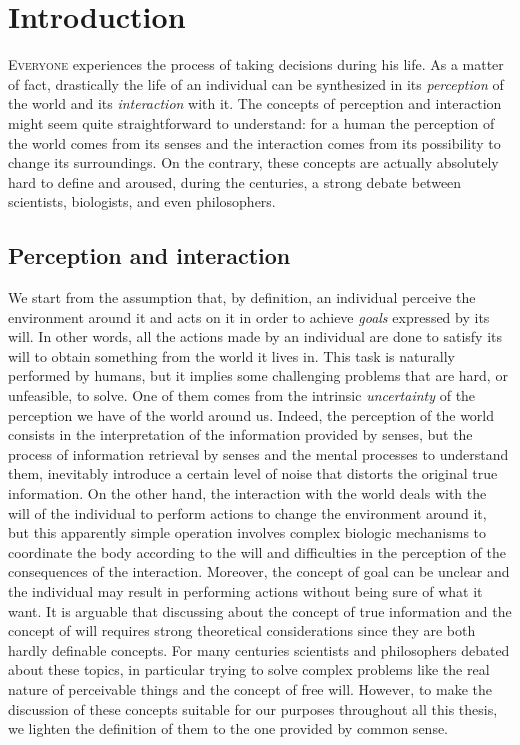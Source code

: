 \chapter{Introduction}
\lettrine{E}{veryone} experiences the process of taking decisions during his life. As a matter of fact, drastically the life of an individual can be synthesized in its \textit{perception} of the world and its \textit{interaction} with it. The concepts of perception and interaction might seem quite straightforward to understand: for a human the perception of the world comes from its senses and the interaction comes from its possibility to change its surroundings. On the contrary, these concepts are actually absolutely hard to define and aroused, during the centuries, a strong debate between scientists, biologists, and even philosophers.

\section{Perception and interaction}
We start from the assumption that, by definition, an individual perceive the environment around it and acts on it in order to achieve \textit{goals} expressed by its will. In other words, all the actions made by an individual are done to satisfy its will to obtain something from the world it lives in. This task is naturally performed by humans, but it implies some challenging problems that are hard, or unfeasible, to solve. One of them comes from the intrinsic \textit{uncertainty} of the perception we have of the world around us. Indeed, the perception of the world consists in the interpretation of the information provided by senses, but the process of information retrieval by senses and the mental processes to understand them, inevitably introduce a certain level of noise that distorts the original true information. On the other hand, the interaction with the world deals with the will of the individual to perform actions to change the environment around it, but this apparently simple operation involves complex biologic mechanisms to coordinate the body according to the will and difficulties in the perception of the consequences of the interaction. Moreover, the concept of goal can be unclear and the individual may result in performing actions without being sure of what it want.
It is arguable that discussing about the concept of true information and the concept of will requires strong theoretical considerations since they are both hardly definable concepts. For many centuries scientists and philosophers debated about these topics, in particular trying to solve complex problems like the real nature of perceivable things and the concept of free will. However, to make the discussion of these concepts suitable for our purposes throughout all this thesis, we lighten the definition of them to the one provided by common sense.

